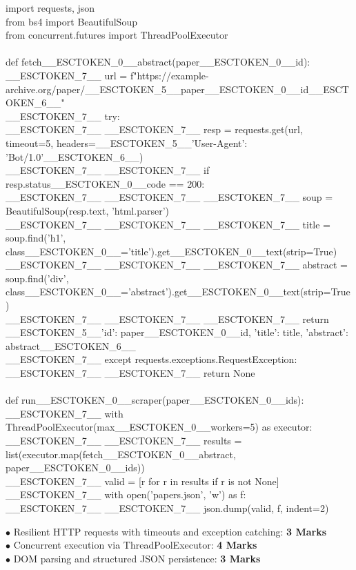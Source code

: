 \begin{solutionbox}
\begin{pycode}
import requests, json\\
from bs4 import BeautifulSoup\\
from concurrent.futures import ThreadPoolExecutor\\
~\\
def fetch\_\_ESCTOKEN\_0\_\_abstract(paper\_\_ESCTOKEN\_0\_\_id):\\
\_\_ESCTOKEN\_7\_\_ url = f"https://example-archive.org/paper/\_\_ESCTOKEN\_5\_\_paper\_\_ESCTOKEN\_0\_\_id\_\_ESCTOKEN\_6\_\_"\\
\_\_ESCTOKEN\_7\_\_ try:\\
\_\_ESCTOKEN\_7\_\_ \_\_ESCTOKEN\_7\_\_ resp = requests.get(url, timeout=5, headers=\_\_ESCTOKEN\_5\_\_'User-Agent': 'Bot/1.0'\_\_ESCTOKEN\_6\_\_)\\
\_\_ESCTOKEN\_7\_\_ \_\_ESCTOKEN\_7\_\_ if resp.status\_\_ESCTOKEN\_0\_\_code == 200:\\
\_\_ESCTOKEN\_7\_\_ \_\_ESCTOKEN\_7\_\_ \_\_ESCTOKEN\_7\_\_ soup = BeautifulSoup(resp.text, 'html.parser')\\
\_\_ESCTOKEN\_7\_\_ \_\_ESCTOKEN\_7\_\_ \_\_ESCTOKEN\_7\_\_ title = soup.find('h1', class\_\_ESCTOKEN\_0\_\_='title').get\_\_ESCTOKEN\_0\_\_text(strip=True)\\
\_\_ESCTOKEN\_7\_\_ \_\_ESCTOKEN\_7\_\_ \_\_ESCTOKEN\_7\_\_ abstract = soup.find('div', class\_\_ESCTOKEN\_0\_\_='abstract').get\_\_ESCTOKEN\_0\_\_text(strip=True)\\
\_\_ESCTOKEN\_7\_\_ \_\_ESCTOKEN\_7\_\_ \_\_ESCTOKEN\_7\_\_ return \_\_ESCTOKEN\_5\_\_'id': paper\_\_ESCTOKEN\_0\_\_id, 'title': title, 'abstract': abstract\_\_ESCTOKEN\_6\_\_\\
\_\_ESCTOKEN\_7\_\_ except requests.exceptions.RequestException:\\
\_\_ESCTOKEN\_7\_\_ \_\_ESCTOKEN\_7\_\_ return None\\
~\\
def run\_\_ESCTOKEN\_0\_\_scraper(paper\_\_ESCTOKEN\_0\_\_ids):\\
\_\_ESCTOKEN\_7\_\_ with ThreadPoolExecutor(max\_\_ESCTOKEN\_0\_\_workers=5) as executor:\\
\_\_ESCTOKEN\_7\_\_ \_\_ESCTOKEN\_7\_\_ results = list(executor.map(fetch\_\_ESCTOKEN\_0\_\_abstract, paper\_\_ESCTOKEN\_0\_\_ids))\\
\_\_ESCTOKEN\_7\_\_ valid = [r for r in results if r is not None]\\
\_\_ESCTOKEN\_7\_\_ with open('papers.json', 'w') as f:\\
\_\_ESCTOKEN\_7\_\_ \_\_ESCTOKEN\_7\_\_ json.dump(valid, f, indent=2)
\end{pycode}
\begin{markingrubric}
$\bullet$ Resilient HTTP requests with timeouts and exception catching: \textbf{3 Marks}\\$\bullet$ Concurrent execution via ThreadPoolExecutor: \textbf{4 Marks}\\$\bullet$ DOM parsing and structured JSON persistence: \textbf{3 Marks}
\end{markingrubric}
\end{solutionbox}
